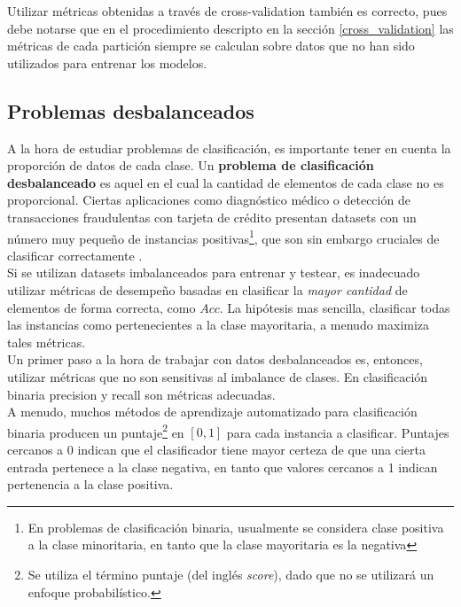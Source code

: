 Utilizar métricas obtenidas a través de cross-validation también es correcto, pues debe notarse que en el procedimiento descripto en la sección \ref{cross_validation} las métricas de cada partición siempre se calculan sobre datos que no han sido utilizados para entrenar los modelos.

\subsection{Problemas desbalanceados}
\label{imbalance}

A la hora de estudiar problemas de clasificación, es importante tener en cuenta la proporción de datos de cada clase. Un \textbf{problema de clasificación desbalanceado} es aquel en el cual la cantidad de elementos de cada clase no es proporcional. Ciertas aplicaciones como diagnóstico médico o detección de transacciones fraudulentas con tarjeta de crédito presentan datasets con un número muy pequeño de instancias positivas\footnote{En problemas de clasificación binaria, usualmente se considera clase positiva a la clase minoritaria, en tanto que la clase mayoritaria es la negativa}, que son sin embargo cruciales de clasificar correctamente \cite{imbalanced_svm}. \\

Si se utilizan datasets imbalanceados para entrenar y testear, es inadecuado utilizar métricas de desempeño basadas en clasificar la \textit{mayor cantidad} de elementos de forma correcta, como $Acc$. La hipótesis mas sencilla, clasificar todas las instancias como pertenecientes a la clase mayoritaria, a menudo maximiza tales métricas. \\

Un primer paso a la hora de trabajar con datos desbalanceados es, entonces, utilizar métricas que no son sensitivas al imbalance de clases. En clasificación binaria precision y recall son métricas adecuadas. \\

A menudo, muchos métodos de aprendizaje automatizado para clasificación binaria producen un puntaje\footnote{Se utiliza el término puntaje (del inglés \textit{score}), dado que no se utilizará un enfoque probabilístico.} en $[0,1]$ para cada instancia a clasificar. Puntajes cercanos a 0 indican que el clasificador tiene mayor certeza de que una cierta entrada pertenece a la clase negativa, en tanto que valores cercanos a 1 indican pertenencia a la clase positiva. \\

